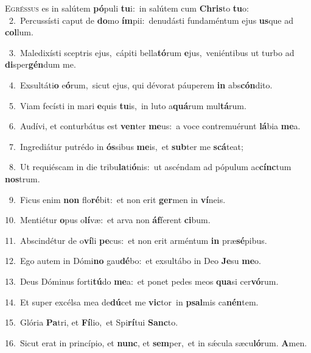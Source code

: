 \lettrine{\initial\textcolor{\initialcolor}{E}}{gréssus} es in salútem \textbf{pó}\-puli \textbf{tu}\-i:~\star in salútem cum \textbf{Chris}\-to \textbf{tu}\-o:\\
{\numbfont\textcolor{\numbcolor}{~2.}}~Percussísti caput de \textbf{do}\-mo \textbf{ím}\-pii:~\star denudásti fundaméntum ejus \textbf{us}\-que ad \textbf{col}\-lum.\par
{\numbfont\textcolor{\numbcolor}{~3.}}~Maledixísti sceptris ejus,~\dagger cápiti bella\-\textbf{tó}\-rum \textbf{e}\-jus,~\star veniéntibus ut turbo ad \textbf{di}\-sper\-\textbf{gén}\-dum me.\par
{\numbfont\textcolor{\numbcolor}{~4.}}~Exsultáti\textbf{o} e\-\textbf{ó}\-rum,~\star sicut ejus, qui dévorat páuperem \textbf{in} abs\-\textbf{cón}\-dito.\par
{\numbfont\textcolor{\numbcolor}{~5.}}~Viam fecísti in mari \textbf{e}\-quis \textbf{tu}\-is,~\star in luto a\-\textbf{quá}\-rum mul\-\textbf{tá}\-rum.\par
{\numbfont\textcolor{\numbcolor}{~6.}}~Audívi, et conturbátus est \textbf{ven}\-ter \textbf{me}\-us:~\star a voce contremuérunt \textbf{lá}\-bia \textbf{me}\-a.\par
{\numbfont\textcolor{\numbcolor}{~7.}}~Ingrediátur putrédo in \textbf{ós}\-sibus \textbf{me}\-is,~\star et \textbf{sub}\-ter me \textbf{scá}\-teat;\par
{\numbfont\textcolor{\numbcolor}{~8.}}~Ut requiéscam in die tribu\-\textbf{la}\-ti\-\textbf{ó}\-nis:~\star ut ascéndam ad pópulum ac\-\textbf{cínc}\-tum \textbf{nos}\-trum.\par
{\numbfont\textcolor{\numbcolor}{~9.}}~Ficus enim \textbf{non} flo\-\textbf{ré}\-bit:~\star et non erit \textbf{ger}\-men in \textbf{ví}\-neis.\par
{\numbfont\textcolor{\numbcolor}{10.}}~Mentiétur \textbf{o}\-pus o\-\textbf{lí}\-væ:~\star et arva non \textbf{áf}\-ferent \textbf{ci}\-bum.\par
{\numbfont\textcolor{\numbcolor}{11.}}~Abscindétur de o\-\textbf{ví}\-li \textbf{pe}\-cus:~\star et non erit arméntum \textbf{in} præ\-\textbf{sé}\-pibus.\par
{\numbfont\textcolor{\numbcolor}{12.}}~Ego autem in Dómi\textbf{no} gau\-\textbf{dé}\-bo:~\star et exsultábo in Deo \textbf{Je}\-su \textbf{me}\-o.\par
{\numbfont\textcolor{\numbcolor}{13.}}~Deus Dóminus forti\-\textbf{tú}\-do \textbf{me}\-a:~\star et ponet pedes meos \textbf{qua}\-si cer\-\textbf{vó}\-rum.\par
{\numbfont\textcolor{\numbcolor}{14.}}~Et super excélsa mea de\-\textbf{dú}\-cet me \textbf{vic}\-tor~\star in \textbf{psal}\-mis ca\-\textbf{nén}\-tem.\par
{\numbfont\textcolor{\numbcolor}{15.}}~Glória \textbf{Pa}\-tri, et \textbf{Fí}\-lio,~\star et Spi\-\textbf{rí}\-tui \textbf{Sanc}\-to.\par
{\numbfont\textcolor{\numbcolor}{16.}}~Sicut erat in princípio, et \textbf{nunc}\-, et \textbf{sem}\-per,~\star et in sǽcula sæcu\-\textbf{ló}\-rum. \textbf{A}\-men.\par
